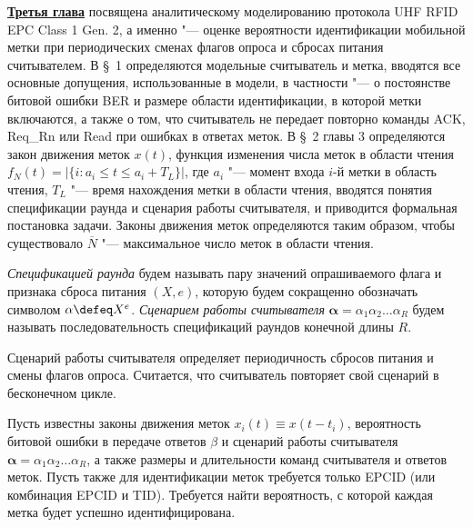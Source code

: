 \underline{\textbf{Третья глава}} посвящена аналитическому моделированию протокола UHF RFID EPC Class 1 Gen. 2, а именно "--- оценке вероятности идентификации мобильной метки при периодических сменах флагов опроса и сбросах питания считывателем. В \S~1 определяются модельные считыватель и метка, вводятся все основные допущения, использованные в модели, в частности "--- о постоянстве битовой ошибки BER и размере области идентификации, в которой метки включаются, а также о том, что считыватель не передает повторно команды ACK, Req\_Rn или Read при ошибках в ответах меток. В \S~2 главы 3 определяются закон движения меток $x(t)$, функция изменения числа меток в области чтения $f_N(t) = | \{ i: a_i \leqslant t \leqslant a_i + T_L \} |$, где $a_i$ "--- момент входа $i$-й метки в область чтения, $T_L$ "--- время нахождения метки в области чтения, вводятся понятия спецификации раунда и сценария работы считывателя, и приводится формальная постановка задачи. Законы движения меток определяются таким образом, чтобы существовало $\overline{N}$ "--- максимальное число меток в области чтения.

\begin{defn}
\textit{Спецификацией раунда} будем называть пару значений опрашиваемого флага и признака сброса питания $(X, e)$, которую будем сокращенно обозначать символом $\alpha \defeq X^{e}$. \textit{Сценарием работы считывателя} $\bm{\alpha} = \alpha_1 \alpha_2 \dots \alpha_R$ будем называть последовательность спецификаций раундов конечной длины $R$.
\end{defn}

Сценарий работы считывателя определяет периодичность сбросов питания и смены флагов опроса. Считается, что считыватель повторяет свой сценарий в бесконечном цикле.

\begin{probl}\label{probl:analytic_problem}
  Пусть известны законы движения меток $x_i(t) \equiv x(t - t_i)$, вероятность битовой ошибки в передаче ответов $\beta$ и сценарий работы считывателя $\bm{\alpha} = \alpha_1 \alpha_2 \dots \alpha_R$, а также размеры и длительности команд считывателя и ответов меток. Пусть также для идентификации меток требуется только EPCID (или комбинация EPCID и TID). Требуется найти вероятность, с которой каждая метка будет успешно идентифицирована.
\end{probl}

